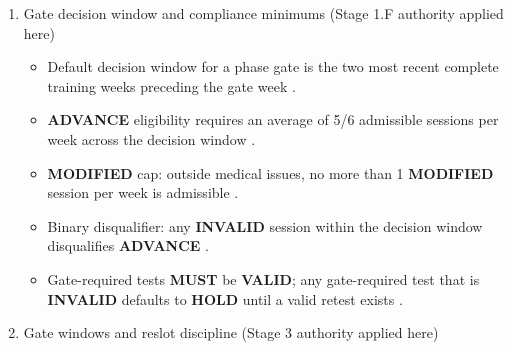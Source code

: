 \documentclass[10pt]{article}
\begin{document}
\begin{enumerate}
\begin{itemize}
\item Gate decisions \textbf{MUST} use admissible evidence only. Evidence that is unsafe, incompletely logged, or executed under compromised governance is inadmissible and cannot support \textbf{ADVANCE} .
\item Sessions: only \textbf{VALID} sessions and admissible \textbf{MODIFIED} sessions (within Stage 1.F cap rules) count toward gate compliance; \textbf{INVALID} sessions do not count and may disqualify \textbf{ADVANCE} in the decision window .
\item Tests: every test is \textbf{VALID} or \textbf{INVALID} only; \textbf{INVALID} provides no gate credit and is treated as “not yet tested” for transition purposes until rerun under \textbf{VALID} conditions (default gate posture \textbf{HOLD} when the test is gate-required) .
\item Dependencies are not paperwork. If a dependency failure materially affects safety, measurability, or comparability, the resulting session/test evidence \textbf{MUST} be treated as non-admissible for gates (default posture \textbf{HOLD}) per Stage 1.C failure doctrine .
\end{itemize}

\item Gate decision window and compliance minimums (Stage 1.F authority applied here)

\begin{itemize}
\item Default decision window for a phase gate is the two most recent complete training weeks preceding the gate week .
\item \textbf{ADVANCE} eligibility requires an average of 5/6 admissible sessions per week across the decision window .
\item \textbf{MODIFIED} cap: outside medical issues, no more than 1 \textbf{MODIFIED} session per week is admissible .
\item Binary disqualifier: any \textbf{INVALID} session within the decision window disqualifies \textbf{ADVANCE} .
\item Gate-required tests \textbf{MUST} be \textbf{VALID}; any gate-required test that is \textbf{INVALID} defaults to \textbf{HOLD} until a valid retest exists .
\end{itemize}

\item Gate windows and reslot discipline (Stage 3 authority applied here)


\end{enumerate}
\end{document}

